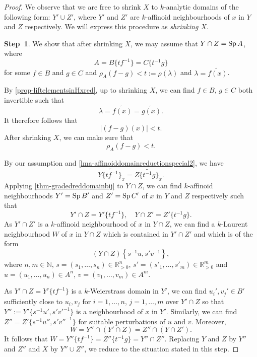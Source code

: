 \begin{proof}
    We observe that we are free to shrink $X$ to $k$-analytic domains of the following form: $Y'\cup Z'$, where $Y'$ and $Z'$ are $k$-affinoid neighbourhoods of $x$ in $Y$ and $Z$ respectively. We will express this procedure as \emph{shrinking $X$}.

    \textbf{Step~1}. We show that after shrinking $X$, we may assume that $Y\cap Z=\operatorname{Sp} A$, where
    \[
        A=B\{tf^{-1}\}=C\{t^{-1}g\}  
    \]
    for some $f\in B$ and $g\in C$ and $\rho_A(f-g)<t:=\rho(\lambda)$ and $\lambda=\widetilde{f(x)}$.

    By \cref{prop-liftelementsinHxred}, up to shrinking $X$, we can find $f\in B$, $g\in C$ both invertible such that 
    \[
        \lambda=\widetilde{f(x)}=\widetilde{g(x)}.  
    \]
    It therefore follows that 
    \[
        |(f-g)(x)|<t.  
    \] 
    After shrinking $X$, we can make sure that 
    \[
        \rho_A(f-g)<t.
    \]

    By our assumption and \cref{lma-affinoiddomainreductionspecial2}, we have
    \[
        \widetilde{Y\{tf^{-1}\}_x}= \widetilde{Z\{t^{-1}g\}_x}. 
    \]
    Applying \cref{thm-gradedreddomainbij} to $Y\cap Z$, we can find $k$-affinoid neighbourhoods $Y'=\operatorname{Sp} B'$ and $Z'=\operatorname{Sp} C'$ of $x$ in $Y$ and $Z$ respectively such that
    \[
        Y'\cap Z=Y'\{tf^{-1}\},\quad Y\cap Z'=Z'\{t^{-1}g\}. 
    \]
    As $Y'\cap Z'$ is a $k$-affinoid neighbourhood of $x$ in $Y\cap Z$, we can find a $k$-Laurent neighbourhood $W$ of $x$ in $Y\cap Z$ which is contained in $Y'\cap Z'$ and which is of the form
    \[
        (Y\cap Z)\left\{s^{-1}u,s'v^{-1}\right\},  
    \]
    where $n,m\in \mathbb{N}$, $s=(s_1,\ldots,s_n)\in \mathbb{R}_{>0}^n$, $s'=(s'_1,\ldots,s'_m)\in \mathbb{R}_{>0}^m$ and $u=(u_1,\ldots,u_n)\in A^n$, $v=(v_1,\ldots,v_m)\in A^m$.

    As $Y'\cap Z=Y'\{tf^{-1}\}$ is a $k$-Weierstrass domain in $Y'$, we can find $u_i',v_j'\in B'$ sufficiently close to $u_i,v_j$ for $i=1,\dots,n$, $j=1,\ldots,m$ over $Y'\cap Z$ so that $Y'':=Y'\{s^{-1}u',s'v'^{-1}\}$ is a neighbourhood of $x$ in $Y'$. Similarly, we can find $Z''=Z'\{s^{-1}u'',s'v''^{-1}\}$ for suitable perturbations of $u$ and $v$. Moreover,
    \[
        W=Y''\cap (Y'\cap Z)=Z''\cap (Y\cap Z').  
    \]
    It follows that $W=Y''\{tf^{-1}\}=Z''\{t^{-1}g\}=Y''\cap Z''$. Replacing $Y$ and $Z$ by $Y''$ and $Z''$ and $X$ by $Y''\cup Z''$, we reduce to the situation stated in this step.



\end{proof}
